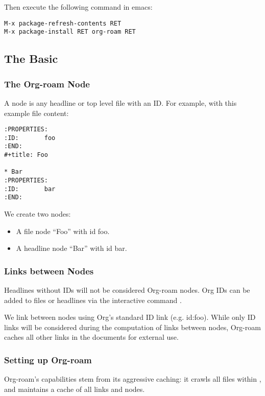 Then execute the following command in emacs:
\begin{lstlisting}
M-x package-refresh-contents RET
M-x package-install RET org-roam RET
\end{lstlisting}


\subsection{The Basic}
\label{sec:basic-1}

\subsubsection{The Org-roam Node}
\label{sec:org-roam-node}


A node is any headline or top level file with an ID.
For example, with this example file content:

\begin{verbatim}
:PROPERTIES:
:ID:       foo
:END:
#+title: Foo

* Bar
:PROPERTIES:
:ID:       bar
:END:
\end{verbatim}

We create two nodes:

\begin{itemize}
\item A file node “Foo” with id foo.
\item A headline node “Bar” with id bar.
\end{itemize}

\subsubsection{Links between Nodes}
\label{sec:links-between-nodes}


Headlines without IDs will not be considered Org-roam nodes.
Org IDs can be added to files or headlines via the interactive command .


We link between nodes using Org’s standard ID link (e.g. id:foo).
While only ID links will be considered during the computation of links between nodes, Org-roam caches all other links in the documents for external use.

\subsubsection{Setting up Org-roam}
\label{sec:setting-up-org}


Org-roam’s capabilities stem from its aggressive caching: it crawls all files within , and maintains a cache of all links and nodes.

